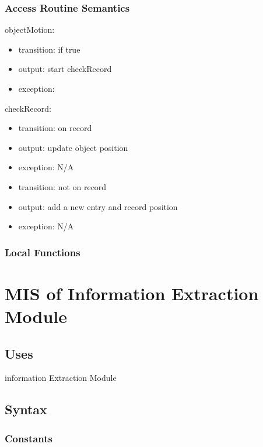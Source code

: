\documentclass[12pt, titlepage]{article}
\begin{document}
\subsubsection{Access Routine Semantics}

\noindent objectMotion:
\begin{itemize}
\item transition: if true 
\item output: start checkRecord
\item exception: 
\end{itemize}

\noindent checkRecord:
\begin{itemize}
\item transition: on record
\item output: update object position
\item exception: N/A
\item transition: not on record
\item output: add a new entry and record position
\item exception: N/A
\end{itemize}


\subsubsection{Local Functions}

 

\newpage
\section{MIS of Information Extraction Module} 



\subsection{Uses}
information Extraction Module

\subsection{Syntax}

\subsubsection{Constants}
\end{document}
